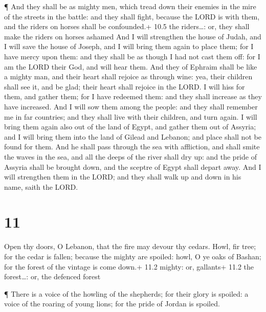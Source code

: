  ¶ And they shall be as mighty men, which tread down their
enemies in the mire of the streets in the battle: and they shall fight,
because the LORD is with them, and the riders on horses shall be
confounded.+ 10.5 the riders\ldots: or, they shall make the riders on
horses ashamed  And I will strengthen the house of Judah,
and I will save the house of Joseph, and I will bring them again to
place them; for I have mercy upon them: and they shall be as though I
had not cast them off: for I am the LORD their God, and will hear them.
 And they of Ephraim shall be like a mighty man, and their
heart shall rejoice as through wine: yea, their children shall see it,
and be glad; their heart shall rejoice in the LORD.  I will
hiss for them, and gather them; for I have redeemed them: and they shall
increase as they have increased.  And I will sow them among
the people: and they shall remember me in far countries; and they shall
live with their children, and turn again.  I will bring
them again also out of the land of Egypt, and gather them out of
Assyria; and I will bring them into the land of Gilead and Lebanon; and
place shall not be found for them.  And he shall pass
through the sea with affliction, and shall smite the waves in the sea,
and all the deeps of the river shall dry up: and the pride of Assyria
shall be brought down, and the sceptre of Egypt shall depart away.
 And I will strengthen them in the LORD; and they shall
walk up and down in his name, saith the LORD.

\hypertarget{section-10}{%
\section{11}\label{section-10}}

 Open thy doors, O Lebanon, that the fire may devour thy
cedars.  Howl, fir tree; for the cedar is fallen; because
the mighty are spoiled: howl, O ye oaks of Bashan; for the forest of the
vintage is come down.+ 11.2 mighty: or, gallants+ 11.2 the forest\ldots:
or, the defenced forest

 ¶ There is a voice of the howling of the shepherds; for
their glory is spoiled: a voice of the roaring of young lions; for the
pride of Jordan is spoiled.

